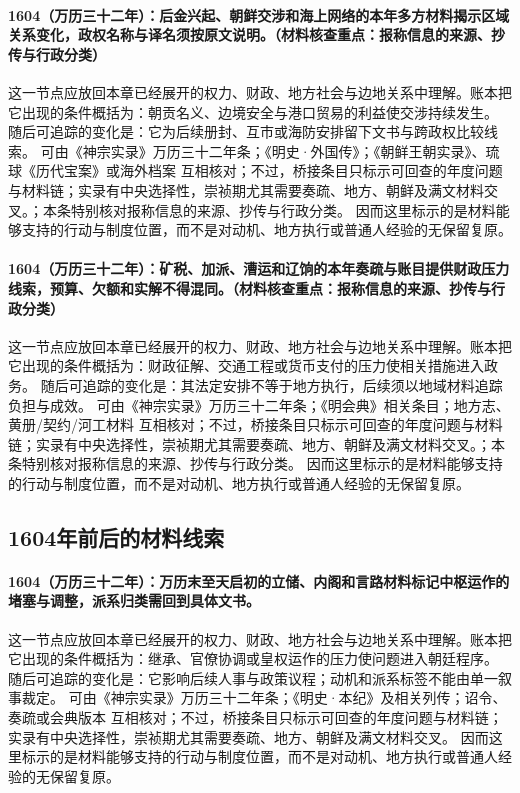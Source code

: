 \paragraph{1604（万历三十二年）：后金兴起、朝鲜交涉和海上网络的本年多方材料揭示区域关系变化，政权名称与译名须按原文说明。（材料核查重点：报称信息的来源、抄传与行政分类）} 这一节点应放回本章已经展开的权力、财政、地方社会与边地关系中理解。账本把它出现的条件概括为：朝贡名义、边境安全与港口贸易的利益使交涉持续发生。 随后可追踪的变化是：它为后续册封、互市或海防安排留下文书与跨政权比较线索。 可由《神宗实录》万历三十二年条；《明史·外国传》；《朝鲜王朝实录》、琉球《历代宝案》或海外档案 互相核对；不过，桥接条目只标示可回查的年度问题与材料链；实录有中央选择性，崇祯期尤其需要奏疏、地方、朝鲜及满文材料交叉。；本条特别核对报称信息的来源、抄传与行政分类。 因而这里标示的是材料能够支持的行动与制度位置，而不是对动机、地方执行或普通人经验的无保留复原。

\paragraph{1604（万历三十二年）：矿税、加派、漕运和辽饷的本年奏疏与账目提供财政压力线索，预算、欠额和实解不得混同。（材料核查重点：报称信息的来源、抄传与行政分类）} 这一节点应放回本章已经展开的权力、财政、地方社会与边地关系中理解。账本把它出现的条件概括为：财政征解、交通工程或货币支付的压力使相关措施进入政务。 随后可追踪的变化是：其法定安排不等于地方执行，后续须以地域材料追踪负担与成效。 可由《神宗实录》万历三十二年条；《明会典》相关条目；地方志、黄册/契约/河工材料 互相核对；不过，桥接条目只标示可回查的年度问题与材料链；实录有中央选择性，崇祯期尤其需要奏疏、地方、朝鲜及满文材料交叉。；本条特别核对报称信息的来源、抄传与行政分类。 因而这里标示的是材料能够支持的行动与制度位置，而不是对动机、地方执行或普通人经验的无保留复原。

\subsection{1604年前后的材料线索}

\paragraph{1604（万历三十二年）：万历末至天启初的立储、内阁和言路材料标记中枢运作的堵塞与调整，派系归类需回到具体文书。} 这一节点应放回本章已经展开的权力、财政、地方社会与边地关系中理解。账本把它出现的条件概括为：继承、官僚协调或皇权运作的压力使问题进入朝廷程序。 随后可追踪的变化是：它影响后续人事与政策议程；动机和派系标签不能由单一叙事裁定。 可由《神宗实录》万历三十二年条；《明史·本纪》及相关列传；诏令、奏疏或会典版本 互相核对；不过，桥接条目只标示可回查的年度问题与材料链；实录有中央选择性，崇祯期尤其需要奏疏、地方、朝鲜及满文材料交叉。 因而这里标示的是材料能够支持的行动与制度位置，而不是对动机、地方执行或普通人经验的无保留复原。

